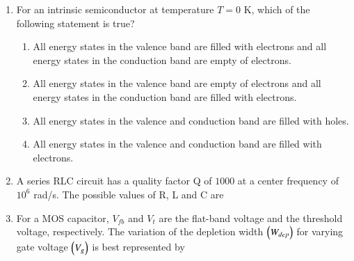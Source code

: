 \documentclass[a4paper, 11pt]{article}
\begin{document}
\begin{enumerate}
    \hfill{}
    
    \item For an intrinsic semiconductor at temperature $T=0$ K, which of the following statement is true?
    
    \begin{enumerate}
        \item All energy states in the valence band are filled with electrons and all energy states in the conduction band are empty of electrons.
        \item All energy states in the valence band are empty of electrons and all energy states in the conduction band are filled with electrons.
        \item All energy states in the valence and conduction band are filled with holes.
        \item All energy states in the valence and conduction band are filled with electrons.
    \end{enumerate}
    
    \hfill{}
    
    \item A series RLC circuit has a quality factor Q of $1000$ at a center frequency of $10^6$ rad/s. The possible values of R, L and C are
    
    \begin{enumerate}
    \end{enumerate}
    
    \hfill{}
    
    \item For a MOS capacitor, $V_{fb}$ and $V_t$ are the flat-band voltage and the threshold voltage, respectively. The variation of the depletion width $\left(W_{dep}\right)$ for varying gate voltage $\left(V_g\right)$ is best represented by
    

\end{enumerate}
\end{document}

